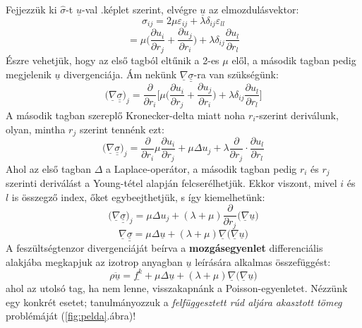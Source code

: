 \documentclass[a4paper, 12pt, titlepage]{article}
\begin{document}
\newline
Fejjezzük ki $\hat{\sigma}$-t $\underline{u}$-val .\hspace{1mm}képlet szerint, elvégre $\underline{u}$ az elmozdulásvektor:
\[\sigma_{ij}=2\mu\varepsilon_{ij}+\lambda\delta_{ij}\varepsilon_{ll}\]
\[=\mu\bigg(\frac{\partial u_{i}}{\partial r_{j}}+\frac{\partial u_{j}}{\partial r_{i}}\bigg)+\lambda\delta_{ij}\frac{\partial u_{l}}{\partial r_{l}}\]
Észre vehetjük, hogy az első tagból eltűnik a 2-es $\mu$ elől, a második tagban pedig megjelenik $\underline{u}$ divergenciája.
\newline
Ám nekünk $\underline{\nabla}\underline{\underline{\sigma}}$-ra van szükségünk:
\[\Big(\underline{\nabla}\underline{\underline{\sigma}}\Big)_{j}=\frac{\partial}{\partial r_{i}}\Bigg[\mu\bigg(\frac{\partial u_{i}}{\partial r_{j}}+\frac{\partial u_{j}}{\partial r_{i}}\bigg)+\lambda\delta_{ij}\frac{\partial u_{l}}{\partial r_{l}}\Bigg]\]
A második tagban szereplő Kronecker-delta miatt noha $r_{i}$-szerint deriválunk, olyan, mintha $r_{j}$ szerint tennénk ezt:
\[\Big(\underline{\nabla}\underline{\underline{\sigma}}\Big)_{j}=\frac{\partial}{\partial r_{i}}\mu\frac{\partial u_{i}}{\partial r_{j}}+\mu\Delta u_{j}+\lambda\frac{\partial}{\partial r_{j}}\cdot\frac{\partial u_{l}}{\partial r_{l}}\]
Ahol az első tagban $\Delta$ a Laplace-operátor, a második tagban pedig $r_{i}$ és $r_{j}$ szerinti deriválást a Young-tétel alapján felcserélhetjük. Ekkor viszont, mivel $i$ és $l$ is összegző index, őket egybeejthetjük, s így kiemelhetünk:
\[\Big(\underline{\nabla}\underline{\underline{\sigma}}\Big)_{j}=\mu\Delta u_{j}+(\lambda+\mu)\frac{\partial}{\partial r_{j}}\Big(\underline{\nabla}\underline{u}\Big)\]
\[\underline{\nabla}\underline{\underline{\sigma}}=\mu\Delta\underline{u}+(\lambda+\mu)\underline{\nabla}\Big(\underline{\nabla}\underline{u}\Big)\]
A feszültségtenzor divergenciáját beírva a \textbf{mozgásegyenlet} differenciális alakjába megkapjuk az izotrop anyagban $\underline{u}$ leírására alkalmas összefüggést:
	\begin{equation}
\rho\underline{\ddot{u}}=\underline{f^{k}}+\mu\Delta\underline{u}+(\lambda+\mu)\underline{\nabla}\Big(\underline{\nabla}\underline{u}\Big)
	\label{eq:mozgeq} %
	\end{equation}
ahol az utolsó tag, ha nem lenne, visszakapnánk a Poisson-egyenletet.
\newline
Nézzünk egy konkrét esetet; tanulmányozzuk a \textit{felfüggesztett rúd aljára akasztott tömeg} problémáját (\ref{fig:pelda}.\hspace{1mm}ábra)!
\end{document}

